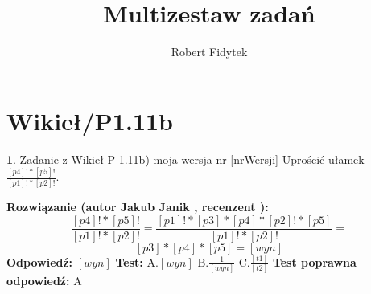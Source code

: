 \documentclass[12pt, a4paper]{article}
\title{Multizestaw zadań}
\author{Robert Fidytek}
\date{}
\theoremstyle{definition} %
\newtheorem{zad}{}
\newcommand{\kategoria}[1]{\section{#1}} %
\newcommand{\zadStart}[1]{\begin{zad}#1\newline} %
\newcommand{\zadStop}{\end{zad}}   %
\newcommand{\rozwStart}[2]{\noindent \textbf{Rozwiązanie (autor #1 , recenzent #2): }\newline} %
\newcommand{\rozwStop}{\newline}                                            %
\newcommand{\odpStart}{\noindent \textbf{Odpowiedź:}\newline}    %
\newcommand{\odpStop}{\newline}                                             %
\newcommand{\testStart}{\noindent \textbf{Test:}\newline} %
\newcommand{\testStop}{\newline} %
\newcommand{\kluczStart}{\noindent \textbf{Test poprawna odpowiedź:}\newline} %
\newcommand{\kluczStop}{\newline} %
\begin{document}
\maketitle


\kategoria{Wikieł/P1.11b}
\zadStart{Zadanie z Wikieł P 1.11b) moja wersja nr [nrWersji]}
Uprościć ułamek $\frac{[p4]!*[p5]!}{[p1]!*[p2]!}$.
\zadStop
\rozwStart{Jakub Janik}{}
$$\frac{[p4]!*[p5]!}{[p1]!*[p2]!}=\frac{[p1]!*[p3]*[p4]*[p2]!*[p5]}{[p1]!*[p2]!}= $$
$$[p3]*[p4]*[p5]=[wyn]$$
\rozwStop
\odpStart
$[wyn]$
\odpStop
\testStart
A.$[wyn]$
B.$\frac{1}{[wyn]}$
C.$\frac{[t1]}{[t2]}$
\testStop
\kluczStart
A
\kluczStop
\end{document}
